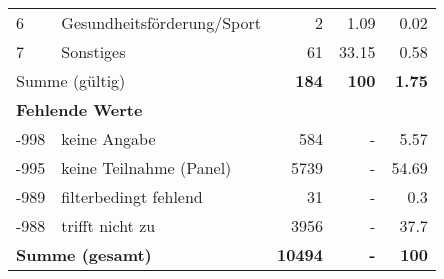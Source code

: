\begin{longtable}{lXrrr}
     6 &
     \multicolumn{1}{X}{ Gesundheitsförderung/Sport   } &


       \num{2} &
       \num[round-mode=places,round-precision=2]{1.09} &
         \num[round-mode=places,round-precision=2]{0.02} \\

     7 &
     \multicolumn{1}{X}{ Sonstiges   } &


       \num{61} &
       \num[round-mode=places,round-precision=2]{33.15} &
         \num[round-mode=places,round-precision=2]{0.58} \\
     \midrule
     \multicolumn{2}{l}{Summe (gültig)} &
       \textbf{\num{184}} &
     \textbf{\num{100}} &
       \textbf{\num[round-mode=places,round-precision=2]{1.75}} \\
     \multicolumn{5}{l}{\textbf{Fehlende Werte}}\\
       -998 &
       keine Angabe &
         \num{584} &
        - &
         \num[round-mode=places,round-precision=2]{5.57} \\
       -995 &
       keine Teilnahme (Panel) &
         \num{5739} &
        - &
         \num[round-mode=places,round-precision=2]{54.69} \\
       -989 &
       filterbedingt fehlend &
         \num{31} &
        - &
         \num[round-mode=places,round-precision=2]{0.3} \\
       -988 &
       trifft nicht zu &
         \num{3956} &
        - &
         \num[round-mode=places,round-precision=2]{37.7} \\
     \midrule
     \multicolumn{2}{l}{\textbf{Summe (gesamt)}} &
          \textbf{\num{10494}} &
        \textbf{-} &
        \textbf{\num{100}} \\
     \bottomrule
     \end{longtable}
     
